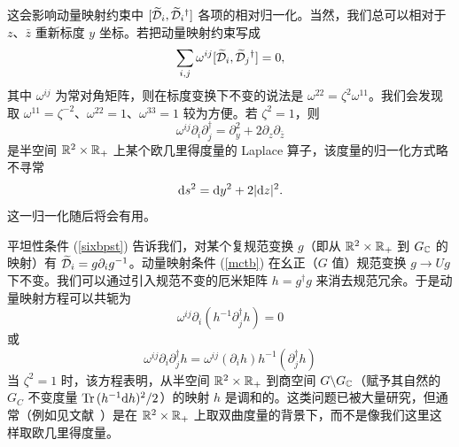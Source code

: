 这会影响动量映射约束中 $ [\widetilde {{\mathcal D}}_i,\widetilde {{\mathcal D}}_i{}^\dagger]$ 各项的相对归一化。当然，我们总可以相对于 $z$、$\bar z$ 重新标度 $y$ 坐标。若把动量映射约束写成
\begin{equation}\label{mctb}  \sum_{i,j} \omega^{ij} [\widetilde {{\mathcal D}}_i,\widetilde {{\mathcal D}}_j{}^\dagger]=0,
\end{equation}
其中 $\omega^{ij}$ 为常对角矩阵，则在标度变换下不变的说法是 $\omega^{22} = \zeta^2 \omega^{11}$。我们会发现取 $\omega^{11} = \zeta^{-2}$、$\omega^{22} = 1$、$\omega^{33}=1$ 较为方便。若 $\zeta^2 =1$，则
\begin{equation}
\omega^{ij}\partial_i \partial^\dagger_j = \partial_y^2 + 2 \partial_z \partial_{\bar z}
\end{equation}
是半空间 ${\mathbb R}^2\times{\mathbb R}_+$ 上某个欧几里得度量的 Laplace 算子，该度量的归一化方式略不寻常
\begin{equation} \label{euc}
{\mathrm d} s^2 = {\mathrm d} y^2 + 2 |{\mathrm d} z|^2.
 \end{equation}
这一归一化随后将会有用。


平坦性条件 (\ref{sixbpst}) 告诉我们，对某个复规范变换 $g$（即从 ${\mathbb R}^2\times{\mathbb R}_+$ 到 $G_{\mathbb C}$ 的映射）有 $\widetilde {{\mathcal D}}_i = g \partial_i g^{-1}$。动量映射条件 (\ref{mctb}) 在幺正（$G$ 值）规范变换 $g\to Ug$ 下不变。我们可以通过引入规范不变的厄米矩阵 $h = g^\dagger g$ 来消去规范冗余。于是动量映射方程可以共轭为
\begin{equation}\label{conj}
 \omega^{ij}\partial_i (h^{-1} \partial^\dagger_j h) = 0
\end{equation}
或
\begin{equation}\label{conjtwo}
 \omega^{ij}\partial_i \partial^\dagger_j h = \omega^{ij}(\partial_i h) h^{-1}( \partial^\dagger_j h)
\end{equation}
当 $\zeta^2 =1$ 时，该方程表明，从半空间 ${\mathbb R}^2\times{\mathbb R}_+$ 到商空间 $G\backslash G_{\mathbb C}$（赋予其自然的 $G_C$ 不变度量 $ \mathrm{Tr}\, ( h^{-1} {\mathrm d} h)^2/2$）的映射 $h$ 是调和的。这类问题已被大量研究，但通常（例如见文献~\cite{LiTam}）是在 ${\mathbb R}^2\times{\mathbb R}_+$ 上取双曲度量的背景下，而不是像我们这里这样取欧几里得度量。

